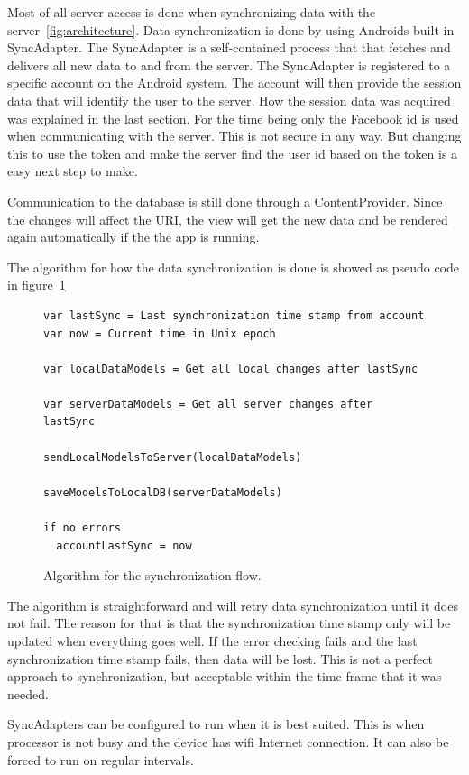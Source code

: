 Most of all server access is done when synchronizing data with the server~\ref{fig:architecture}. 
Data synchronization is done by using Androids built in SyncAdapter. The SyncAdapter is a self-contained process that that fetches and delivers all new data to and from the server. The SyncAdapter is registered to a specific account on the Android system. The account will then provide the session data that will identify the user to the server. How the session data was acquired was explained in the last section. For the time being only the Facebook id is used when communicating with the server. This is not secure in any way. But changing this to use the token and make the server find the user id based on the token is a easy next step to make.

Communication to the database is still done through a ContentProvider. Since the changes will affect the URI, the view will get the new data and be rendered again automatically if the the app is running. 

The algorithm for how the data synchronization is done is showed as pseudo code in figure~\ref{fig:algorithm_sync}

\begin{figure}[H]
\begin{lstlisting}[]
var lastSync = Last synchronization time stamp from account
var now = Current time in Unix epoch

var localDataModels = Get all local changes after lastSync

var serverDataModels = Get all server changes after lastSync

sendLocalModelsToServer(localDataModels)

saveModelsToLocalDB(serverDataModels)

if no errors
  accountLastSync = now
\end{lstlisting}
\caption{Algorithm for the synchronization flow.}
\label{fig:algorithm_sync}
\end{figure}

The algorithm is straightforward and will retry data synchronization until it does not fail. The reason for that is that the synchronization time stamp only will be updated when everything goes well. If the error checking fails and the last synchronization time stamp fails, then data will be lost. 
This is not a perfect approach to synchronization, but acceptable within the time frame that it was needed. 

SyncAdapters can be configured to run when it is best suited. This is when processor is not busy and the device has wifi Internet connection. It can also be forced to run on regular intervals.

